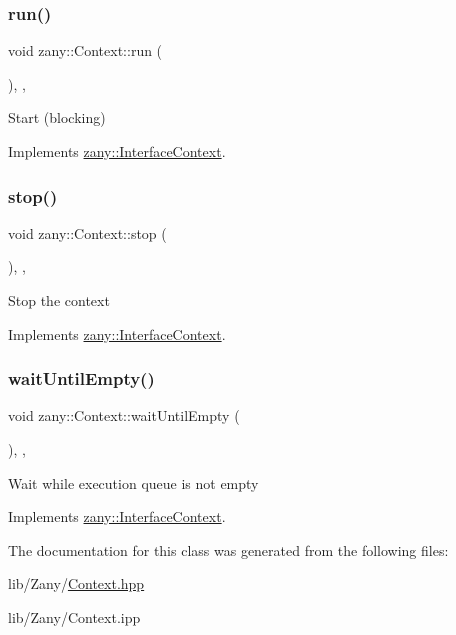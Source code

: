 \subsubsection{\texorpdfstring{run()}{run()}}
{\footnotesize\ttfamily void zany\+::\+Context\+::run (\begin{DoxyParamCaption}{ }\end{DoxyParamCaption})\hspace{0.3cm}{\ttfamily [inline]}, {\ttfamily [final]}, {\ttfamily [virtual]}}

Start (blocking) 

Implements \hyperlink{classzany_1_1_interface_context_a225552253490052c2fb75f05169b16a7}{zany\+::\+Interface\+Context}.

\mbox{\label{classzany_1_1_context_ae99b0f88172d429cc43b83effced053e}} 
\subsubsection{\texorpdfstring{stop()}{stop()}}
{\footnotesize\ttfamily void zany\+::\+Context\+::stop (\begin{DoxyParamCaption}{ }\end{DoxyParamCaption})\hspace{0.3cm}{\ttfamily [inline]}, {\ttfamily [final]}, {\ttfamily [virtual]}}

Stop the context 

Implements \hyperlink{classzany_1_1_interface_context_a13d40a4b37fca39813fe231e4081c022}{zany\+::\+Interface\+Context}.

\mbox{\label{classzany_1_1_context_aa611ac3befc23b58e8cef92932f21b67}} 
\subsubsection{\texorpdfstring{wait\+Until\+Empty()}{waitUntilEmpty()}}
{\footnotesize\ttfamily void zany\+::\+Context\+::wait\+Until\+Empty (\begin{DoxyParamCaption}{ }\end{DoxyParamCaption})\hspace{0.3cm}{\ttfamily [inline]}, {\ttfamily [final]}, {\ttfamily [virtual]}}

Wait while execution queue is not empty 

Implements \hyperlink{classzany_1_1_interface_context_a92f9597c6b6b7af0287a7f5178c2d063}{zany\+::\+Interface\+Context}.



The documentation for this class was generated from the following files\+:\begin{DoxyCompactItemize}
\item 
lib/\+Zany/\hyperlink{_context_8hpp}{Context.\+hpp}\item 
lib/\+Zany/Context.\+ipp\end{DoxyCompactItemize}
